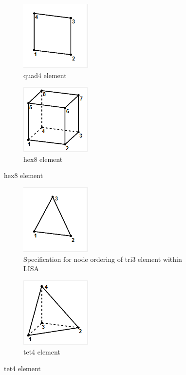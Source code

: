 \begin{figure}[ht]
\centering
\begin{subfigure}{.5\textwidth}
  \centering
  \includegraphics[width=0.3\linewidth]{../Graphics/LISA-quad4.png}
  \caption{quad4 element}
  \label{fig:sub1}
\end{subfigure}%
\begin{subfigure}{.5\textwidth}
  \centering
  \includegraphics[width=0.3\linewidth]{../Graphics/LISA-hex8.png}
  \caption{hex8 element}
  \label{fig:sub2}
\end{subfigure}
\label{fig:test}
\end{figure}


\begin{figure}[ht]
\centering
\begin{subfigure}{.5\textwidth}
  \centering
  \includegraphics[width=0.3\linewidth]{../Graphics/LISA-tri3.png}
  \caption{Specification for node ordering of tri3 element within LISA}
  \label{fig:sub1}
\end{subfigure}%
\begin{subfigure}{.5\textwidth}
  \centering
  \includegraphics[width=0.3\linewidth]{../Graphics/LISA-tet4.png}
  \caption{tet4 element}
  \label{fig:sub2}
\end{subfigure}
\label{fig:test}
\end{figure}


